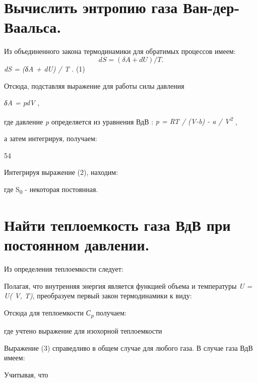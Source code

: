 \section{Вычислить энтропию газа Ван-дер-Ваальса.}

\solving{}

Из объединенного закона термодинамики для обратимых процессов имеем:
\begin{equation}
  dS = (\delta A + dU)/T.
\end{equation}
\emph{dS = (δA + dU) / T} . (1)

Отсюда, подставляя выражение для работы силы давления

\emph{δA = pdV} ,

где давление \emph{p} определяется из уравнения ВдВ : \emph{p = RT /
(V-b) - a / V\textsuperscript{2}} ,

а затем интегрируя, получаем:


54

Интегрируя выражение (2), находим:


где S\textsubscript{0} - некоторая постоянная.

\section{Найти теплоемкость газа ВдВ при постоянном давлении.}

\solving{}

Из определения теплоемкости следует:

Полагая, что внутренняя энергия является функцией объема и температуры
\emph{U = U( V, T)}, преобразуем первый закон термодинамики к виду:


Отсюда для теплоемкости \emph{С\textsubscript{p}} получаем:


где учтено выражение для изохорной теплоемкости

Выражение (3) справедливо в общем случае для любого газа. В случае газа
ВдВ имеем: %

Учитывая, что %

